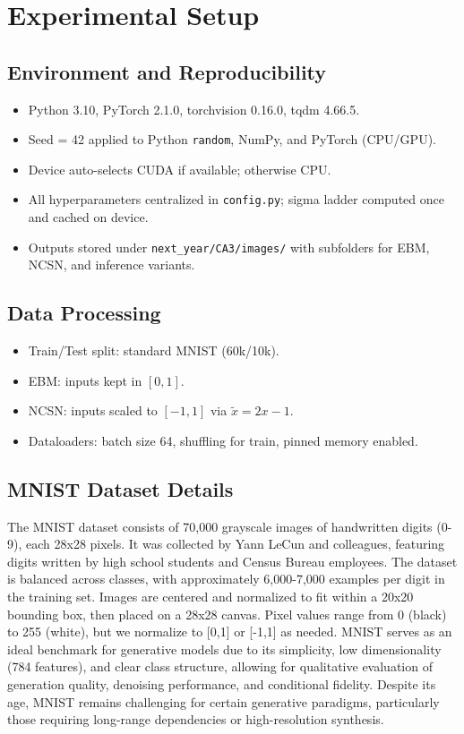 \documentclass[a4paper,12pt]{article}
\begin{document}
\section{Experimental Setup}
\subsection{Environment and Reproducibility}
\begin{itemize}[leftmargin=*]
    \item Python 3.10, PyTorch 2.1.0, torchvision 0.16.0, tqdm 4.66.5.
    \item Seed = 42 applied to Python \texttt{random}, NumPy, and PyTorch (CPU/GPU).
    \item Device auto-selects CUDA if available; otherwise CPU.
    \item All hyperparameters centralized in \texttt{config.py}; sigma ladder computed once and cached on device.
    \item Outputs stored under \texttt{next\_year/CA3/images/} with subfolders for EBM, NCSN, and inference variants.
\end{itemize}

\subsection{Data Processing}
\begin{itemize}[leftmargin=*]
    \item Train/Test split: standard MNIST (60k/10k).
    \item EBM: inputs kept in $[0,1]$.
    \item NCSN: inputs scaled to $[-1,1]$ via $\tilde{x} = 2x - 1$.
    \item Dataloaders: batch size 64, shuffling for train, pinned memory enabled.
\end{itemize}

\subsection{MNIST Dataset Details}
The MNIST dataset consists of 70,000 grayscale images of handwritten digits (0-9), each 28x28 pixels. It was collected by Yann LeCun and colleagues, featuring digits written by high school students and Census Bureau employees. The dataset is balanced across classes, with approximately 6,000-7,000 examples per digit in the training set. Images are centered and normalized to fit within a 20x20 bounding box, then placed on a 28x28 canvas. Pixel values range from 0 (black) to 255 (white), but we normalize to [0,1] or [-1,1] as needed. MNIST serves as an ideal benchmark for generative models due to its simplicity, low dimensionality (784 features), and clear class structure, allowing for qualitative evaluation of generation quality, denoising performance, and conditional fidelity. Despite its age, MNIST remains challenging for certain generative paradigms, particularly those requiring long-range dependencies or high-resolution synthesis.
\end{document}
